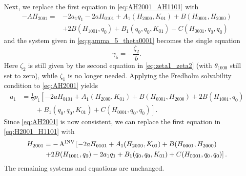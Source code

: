 Next, we replace the first equation in \cref{eq:AH2001_AH1101} with
\begin{equation}
\label{eq:AH2001}
\begin{aligned}
-AH_{2001} ={}& - 2 a_1 q_1 -2 a H_{0101} + A_1(H_{2000},K_{01}) + B(H_{0001},H_{2000}) \\
              & + 2 B(H_{1001},q_0) + B_1(q_0,q_0,K_{01}) + C(H_{0001},q_0,q_0)
\end{aligned}
\end{equation}
and the system given in \cref{eq:gamma_5_theta0001} becomes the single equation
\[
\gamma_5 = -\frac{\zeta_2}{b}.
\]
Here $\zeta_2$ is still given by the second equation in \cref{eq:zeta1_zeta2}
(with $\theta_{1000}$ still set to zero), while $\zeta_1$ is no longer needed.
Applying the Fredholm solvability condition to \cref{eq:AH2001} yields 
\begin{equation*}
\begin{aligned}
    a_1 &= \frac{1}{2} p_1 \left[-2 a H_{0101} + A_1(H_{2000},K_{01}) +
	B(H_{0001},H_{2000}) + 2 B(H_{1001},q_0) \right. \\
        & \left. \qquad + B_1(q_0,q_0,K_{01}) + C(H_{0001},q_0,q_0) \right].
\end{aligned}
\end{equation*}
Since \cref{eq:AH2001} is now consistent, we can replace the first equation in
\cref{eq:H2001_H1101} with
\begin{equation*}
\begin{aligned}
    H_{2001} &{}= -\operatorname{A^{\text{INV}}} \left[ -2 a H_{0101} + A_1(H_{2000},K_{01}) + B(H_{0001},H_{2000})  \right. \\
				& \left. + 2 B(H_{1001},q_0) - 2 a_1 q_1 + B_1(q_0,q_0,K_{01}) + C(H_{0001},q_0,q_0) \right].
\end{aligned}
\end{equation*}
The remaining systems and equations are unchanged.


